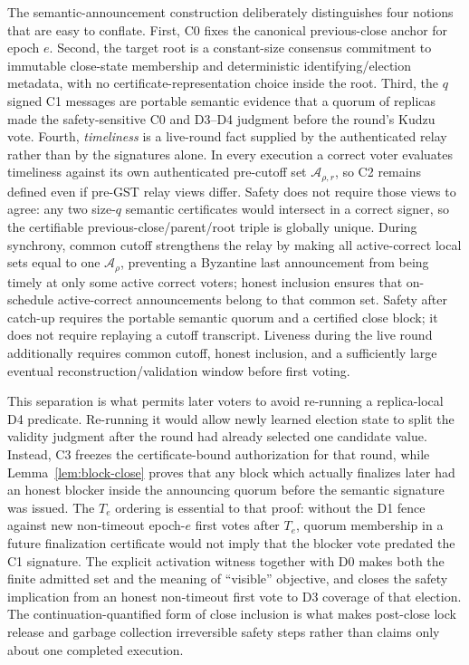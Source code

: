 \documentclass[11pt]{article}
\theoremstyle{definition}
\theoremstyle{remark}
\begin{document}
The semantic-announcement construction deliberately distinguishes four notions that are easy to conflate. First, C0 fixes the canonical previous-close anchor for epoch $e$. Second, the target root is a constant-size consensus commitment to immutable close-state membership and deterministic identifying/election metadata, with no certificate-representation choice inside the root. Third, the $q$ signed C1 messages are portable semantic evidence that a quorum of replicas made the safety-sensitive C0 and D3--D4 judgment before the round's Kudzu vote. Fourth, \emph{timeliness} is a live-round fact supplied by the authenticated relay rather than by the signatures alone. In every execution a correct voter evaluates timeliness against its own authenticated pre-cutoff set $\mathcal A_{\rho,r}$, so C2 remains defined even if pre-GST relay views differ. Safety does not require those views to agree: any two size-$q$ semantic certificates would intersect in a correct signer, so the certifiable previous-close/parent/root triple is globally unique. During synchrony, common cutoff strengthens the relay by making all active-correct local sets equal to one $\mathcal A_\rho$, preventing a Byzantine last announcement from being timely at only some active correct voters; honest inclusion ensures that on-schedule active-correct announcements belong to that common set. Safety after catch-up requires the portable semantic quorum and a certified close block; it does not require replaying a cutoff transcript. Liveness during the live round additionally requires common cutoff, honest inclusion, and a sufficiently large eventual reconstruction/validation window before first voting.

This separation is what permits later voters to avoid re-running a replica-local D4 predicate. Re-running it would allow newly learned election state to split the validity judgment after the round had already selected one candidate value. Instead, C3 freezes the certificate-bound authorization for that round, while Lemma~\ref{lem:block-close} proves that any block which actually finalizes later had an honest blocker inside the announcing quorum before the semantic signature was issued. The $T_e$ ordering is essential to that proof: without the D1 fence against new non-timeout epoch-$e$ first votes after $T_e$, quorum membership in a future finalization certificate would not imply that the blocker vote predated the C1 signature. The explicit activation witness together with D0 makes both the finite admitted set and the meaning of ``visible'' objective, and closes the safety implication from an honest non-timeout first vote to D3 coverage of that election. The continuation-quantified form of close inclusion is what makes post-close lock release and garbage collection irreversible safety steps rather than claims only about one completed execution.
\end{document}
